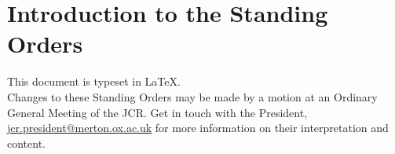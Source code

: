 \chapter{Introduction to the Standing Orders}
This document is typeset in \LaTeX.
\\
Changes to these Standing Orders may be made by a motion at an Ordinary General Meeting of the JCR. Get in touch with the President, \href{mailto:jcr.president@merton.ox.ac.uk}{jcr.president@merton.ox.ac.uk} for more information on their interpretation and content. 